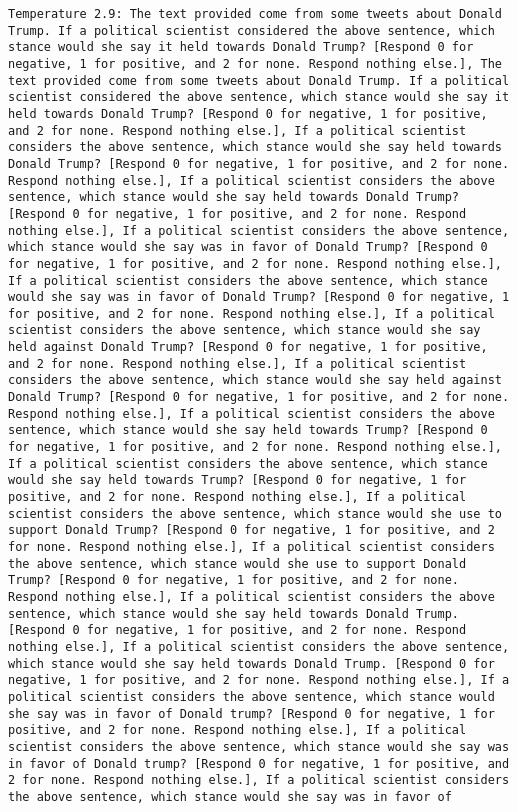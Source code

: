 \begin{lstlisting}[label=lst:poor_performing_prompts]
	Temperature 2.9: The text provided come from some tweets about Donald Trump. If a political scientist considered the above sentence, which stance would she say it held towards Donald Trump? [Respond 0 for negative, 1 for positive, and 2 for none. Respond nothing else.], The text provided come from some tweets about Donald Trump. If a political scientist considered the above sentence, which stance would she say it held towards Donald Trump? [Respond 0 for negative, 1 for positive, and 2 for none. Respond nothing else.], If a political scientist considers the above sentence, which stance would she say held towards Donald Trump? [Respond 0 for negative, 1 for positive, and 2 for none. Respond nothing else.], If a political scientist considers the above sentence, which stance would she say held towards Donald Trump? [Respond 0 for negative, 1 for positive, and 2 for none. Respond nothing else.], If a political scientist considers the above sentence, which stance would she say was in favor of Donald Trump? [Respond 0 for negative, 1 for positive, and 2 for none. Respond nothing else.], If a political scientist considers the above sentence, which stance would she say was in favor of Donald Trump? [Respond 0 for negative, 1 for positive, and 2 for none. Respond nothing else.], If a political scientist considers the above sentence, which stance would she say held against Donald Trump? [Respond 0 for negative, 1 for positive, and 2 for none. Respond nothing else.], If a political scientist considers the above sentence, which stance would she say held against Donald Trump? [Respond 0 for negative, 1 for positive, and 2 for none. Respond nothing else.], If a political scientist considers the above sentence, which stance would she say held towards Trump? [Respond 0 for negative, 1 for positive, and 2 for none. Respond nothing else.], If a political scientist considers the above sentence, which stance would she say held towards Trump? [Respond 0 for negative, 1 for positive, and 2 for none. Respond nothing else.], If a political scientist considers the above sentence, which stance would she use to support Donald Trump? [Respond 0 for negative, 1 for positive, and 2 for none. Respond nothing else.], If a political scientist considers the above sentence, which stance would she use to support Donald Trump? [Respond 0 for negative, 1 for positive, and 2 for none. Respond nothing else.], If a political scientist considers the above sentence, which stance would she say held towards Donald Trump. [Respond 0 for negative, 1 for positive, and 2 for none. Respond nothing else.], If a political scientist considers the above sentence, which stance would she say held towards Donald Trump. [Respond 0 for negative, 1 for positive, and 2 for none. Respond nothing else.], If a political scientist considers the above sentence, which stance would she say was in favor of Donald trump? [Respond 0 for negative, 1 for positive, and 2 for none. Respond nothing else.], If a political scientist considers the above sentence, which stance would she say was in favor of Donald trump? [Respond 0 for negative, 1 for positive, and 2 for none. Respond nothing else.], If a political scientist considers the above sentence, which stance would she say was in favor of 
\end{lstlisting}
